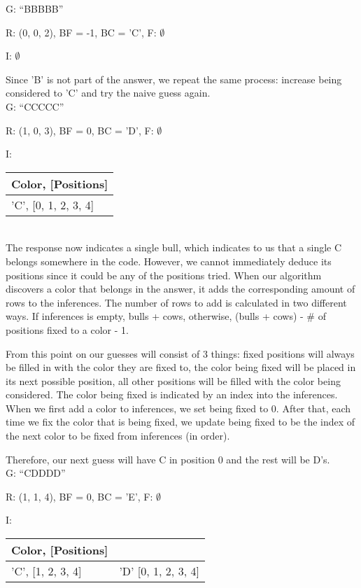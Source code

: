 \documentclass[11pt]{article}
\begin{document}
    \noindent G: \enquote{BBBBB}

    \noindent R: (0, 0, 2), BF = -1, BC = 'C', F: $\emptyset$

    \noindent I: $\emptyset$

    Since 'B' is not part of the answer, we repeat the same process: increase being considered to 'C' and try the naive guess again.\\

    \noindent G: \enquote{CCCCC}

    \noindent R: (1, 0, 3), BF = 0, BC = 'D', F: $\emptyset$

    \noindent I: \begin{tabularx}{.25\textwidth}{|X|}
        \hline
        Color, [Positions]\\\hline 
        'C', [0, 1, 2, 3, 4]\\\hline
    \end{tabularx}\\
    
    The response now indicates a single bull, which indicates to us that a single C belongs somewhere in the code. However, we cannot immediately deduce its positions since it could be any of the positions tried. 
    When our algorithm discovers a color that belongs in the answer, it adds the corresponding amount of rows to the inferences. The number of rows to add is calculated in two different ways. If inferences is empty, bulls + cows, otherwise, (bulls + cows) - \# of positions fixed to a color - 1.

    From this point on our guesses will consist of 3 things: fixed positions will always be filled in with the color they are fixed to, the color being fixed will be placed in its next possible position, all other positions will be filled with the color being considered. The color being fixed is indicated by an index into the inferences. When we first add a color to inferences, we set being fixed to 0. After that, each time we fix the color that is being fixed, we update being fixed to be the index of the next color to be fixed from inferences (in order).

    Therefore, our next guess will have C in position 0 and the rest will be D's.\\

    \noindent G: \enquote{CDDDD}

    \noindent R: (1, 1, 4), BF = 0, BC = 'E', F: $\emptyset$

    \noindent I: \begin{tabularx}{.4\textwidth}{|X|X|}
        \hline
        Color, [Positions]&\\\hline 
        'C', [1, 2, 3, 4] &'D'  [0, 1, 2, 3, 4]\\\hline
    \end{tabularx}\\
    
\end{document}
